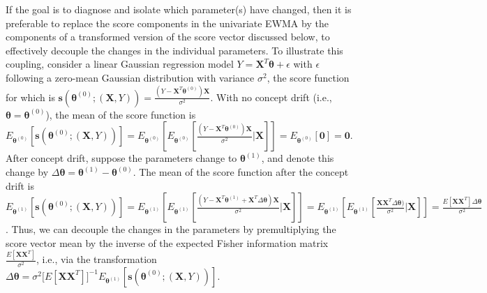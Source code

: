 \documentclass[twoside,11pt]{article}
\begin{document}
If the goal is to diagnose and isolate which parameter(s) have changed, then it is preferable to replace the score components in the univariate EWMA by the components of a transformed version of the score vector discussed below, to effectively decouple the changes in the individual parameters. To illustrate this coupling, consider a linear Gaussian regression model $Y = \bm{X}^T\bm{\theta} + \epsilon$ with $\epsilon$ following a zero-mean Gaussian distribution with variance $\sigma^2$, the score function for which is $\bm{s}(\bm { \theta}^{ (0)}; (\bm {X}, Y)) = \frac{(Y - \bm{X}^T\bm{\theta}^{ (0)})\bm{X}}{\sigma^2}$. With no concept drift (i.e., $\bm { \theta} = \bm { \theta}^{ (0)}$), the mean of the score function is $E_{\bm{ \theta}^{ (0)}}[\bm{s}(\bm { \theta}^{ (0)}; (\bm {X}, Y))] = E_{\bm{ \theta}^{ (0)}}[E_{\bm{ \theta}^{ (0)}}[ \frac{(Y - \bm{X}^T\bm{\theta}^{ (0)})\bm{X}}{\sigma^2}|\bm {X}]] =  E_{\bm{ \theta}^{ (0)}}[\bm{0}] = \bm{0}$. After concept drift, suppose the parameters change to $\bm { \theta} ^{ (1)}$, and denote this change by $ \Delta \bm { \theta} = \bm { \theta} ^{ (1)} - \bm { \theta}^ { (0)}$. The mean of the score function after the concept drift is $E_{\bm{ \theta}^{ (1)}}[\bm{s}(\bm { \theta}^{ (0)}; (\bm {X}, Y))] = E_{\bm{ \theta}^{ (1)}}[E_{\bm{ \theta}^{ (1)}}[\frac{(Y - \bm {X}^T\bm { \theta}^{ (1)} + \bm {X}^T\Delta \bm { \theta}) \bm {X}}{\sigma^2} |\bm {X}]] = E_{\bm{ \theta}^{ (1)}}[E_{\bm{ \theta}^{ (1)}}[\frac{\bm {X}\bm {X}^T\Delta \bm { \theta})}{\sigma^2} |\bm {X}]] = \frac{E [\bm {X}\bm {X}^T] \Delta \bm { \theta}}{\sigma^2}$. Thus, we can decouple the changes in the parameters by premultiplying the score vector mean by the inverse of the expected Fisher information matrix $\frac{E [\bm {X}\bm {X}^T]}{\sigma^2}$, i.e., via the transformation $ \Delta \bm { \theta} = \sigma^2 \big[E [\bm {X}\bm {X}^T]\big]^{-1} E_{\bm{ \theta}^{ (1)}}[\bm{s}(\bm { \theta}^{ (0)}; (\bm {X}, Y))]$. 
\end{document}
